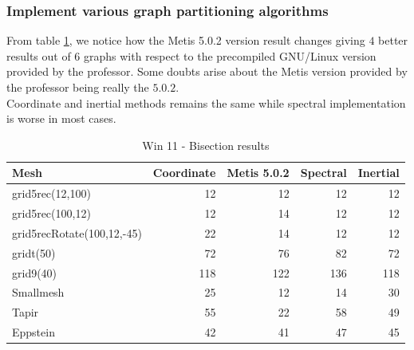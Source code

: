 \documentclass[unicode,11pt,a4paper,oneside,numbers=endperiod,openany]{scrartcl}
\begin{document}
\subsubsection*{Implement various graph partitioning algorithms}

From table \ref{table:win-bisection}, we notice how the Metis 5.0.2 version result changes giving $4$ better results out of $6$ graphs
with respect to the precompiled GNU/Linux version provided by the professor.
Some doubts arise about the Metis version provided by the professor being really the $5.0.2$. \\

Coordinate and inertial methods remains the same while spectral implementation is worse in most cases. \\

\begin{table}[h]
    \caption{Win 11 - Bisection results}
    \centering
    \begin{tabular}{l|r|r|r|r} \hline\hline
        Mesh                       & Coordinate & Metis 5.0.2 & Spectral & Inertial \\ \hline
        grid5rec(12,100)           & 12         & 12          & 12       & 12       \\
        grid5rec(100,12)           & 12         & 14          & 12       & 12       \\
        grid5recRotate(100,12,-45) & 22         & 14          & 12       & 12       \\
        gridt(50)                  & 72         & 76          & 82       & 72       \\
        grid9(40)                  & 118        & 122         & 136      & 118      \\
        Smallmesh                  & 25         & 12          & 14       & 30       \\
        Tapir                      & 55         & 22          & 58       & 49       \\
        Eppstein                   & 42         & 41          & 47       & 45       \\
        \hline \hline
    \end{tabular}
    \label{table:win-bisection}
\end{table}
\end{document}
